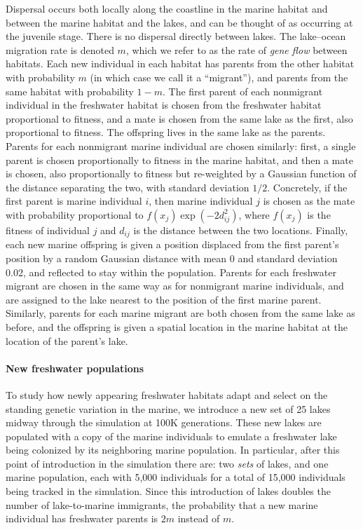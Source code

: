\documentclass{article}
\begin{document}
Dispersal occurs both locally along the coastline in the marine habitat 
and between the marine habitat and the lakes, and can be thought of as occurring at the juvenile stage. 
There is no dispersal directly between lakes.
The lake--ocean migration rate is denoted $m$, 
which we refer to as the rate of \emph{gene flow} between habitats.
Each new individual in each habitat 
has parents from the other habitat with probability $m$ 
(in which case we call it a ``migrant''),
and parents from the same habitat with probability $1-m$.
The first parent of each nonmigrant individual in the freshwater habitat
is chosen from the freshwater habitat proportional to fitness, 
and a mate is chosen from the same lake as the first, also proportional to fitness. 
The offspring lives in the same lake as the parents.
Parents for each nonmigrant marine individual are chosen similarly:
first, a single parent is chosen proportionally to fitness in the marine habitat,
and then a mate is chosen, also proportionally to fitness but re-weighted by a Gaussian function of the distance separating the two, with standard deviation $1/2$. 
Concretely, if the first parent is marine individual $i$, 
then marine individual $j$ is chosen as the mate with probability proportional to $f(x_j) \exp(-2d_{ij}^2)$,
where $f(x_j)$ is the fitness of individual $j$ and $d_{ij}$ is the distance between the two locations. 
Finally, each new marine offspring is given a position displaced from the first parent's position by a random Gaussian distance with mean 0 and standard deviation 0.02, 
and reflected to stay within the population.
Parents for each freshwater migrant are chosen in the same way
as for nonmigrant marine individuals,
and are assigned to the lake nearest to the position of the first marine parent.
Similarly, parents for each marine migrant are both chosen from the same lake as before,
and the offspring is given a spatial location in the marine habitat at the location of the parent's lake. 

\paragraph{New freshwater populations} 
To study how newly appearing freshwater habitats adapt and select on the standing genetic variation in the marine, we introduce a new set of 25 lakes midway through the simulation at 100K generations.
These new lakes are populated with a copy of the marine individuals to emulate a freshwater lake being colonized by its neighboring marine population. 
In particular, after this point of introduction in the simulation there are:
two \emph{sets} of lakes, and one marine population, each with 5,000 individuals for a total of 15,000 individuals being tracked in the simulation. 
Since this introduction of lakes doubles the number of lake-to-marine immigrants, 
the probability that a new marine individual has freshwater parents is $2m$ instead of $m$.
\end{document}
